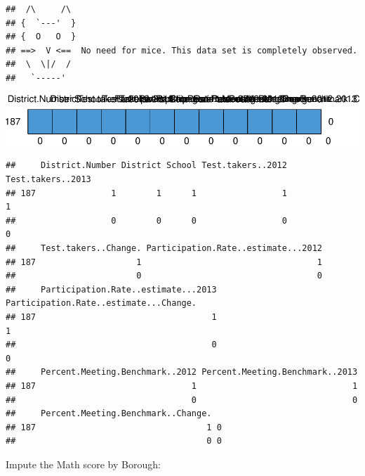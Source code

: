 \documentclass[]{book}
\newenvironment{Shaded}{\begin{snugshade}}{\end{snugshade}}
\newcommand{\CommentTok}[1]{\textcolor[rgb]{0.56,0.35,0.01}{\textit{#1}}}
\newcommand{\DecValTok}[1]{\textcolor[rgb]{0.00,0.00,0.81}{#1}}
\newcommand{\KeywordTok}[1]{\textcolor[rgb]{0.13,0.29,0.53}{\textbf{#1}}}
\newcommand{\NormalTok}[1]{#1}
\newcommand{\OperatorTok}[1]{\textcolor[rgb]{0.81,0.36,0.00}{\textbf{#1}}}
\newcommand{\StringTok}[1]{\textcolor[rgb]{0.31,0.60,0.02}{#1}}
\begin{document}
\begin{verbatim}
##  /\     /\
## {  `---'  }
## {  O   O  }
## ==>  V <==  No need for mice. This data set is completely observed.
##  \  \|/  /
##   `-----'
\end{verbatim}

\includegraphics{code4stem_files/figure-latex/Examine missingness with md.pattern()-1.pdf}

\begin{verbatim}
##     District.Number District School Test.takers..2012 Test.takers..2013
## 187               1        1      1                 1                 1
##                   0        0      0                 0                 0
##     Test.takers..Change. Participation.Rate..estimate...2012
## 187                    1                                   1
##                        0                                   0
##     Participation.Rate..estimate...2013 Participation.Rate..estimate...Change.
## 187                                   1                                      1
##                                       0                                      0
##     Percent.Meeting.Benchmark..2012 Percent.Meeting.Benchmark..2013
## 187                               1                               1
##                                   0                               0
##     Percent.Meeting.Benchmark..Change.  
## 187                                  1 0
##                                      0 0
\end{verbatim}

Impute the Math score by Borough:

\begin{Shaded}
\end{Shaded}
\end{document}
